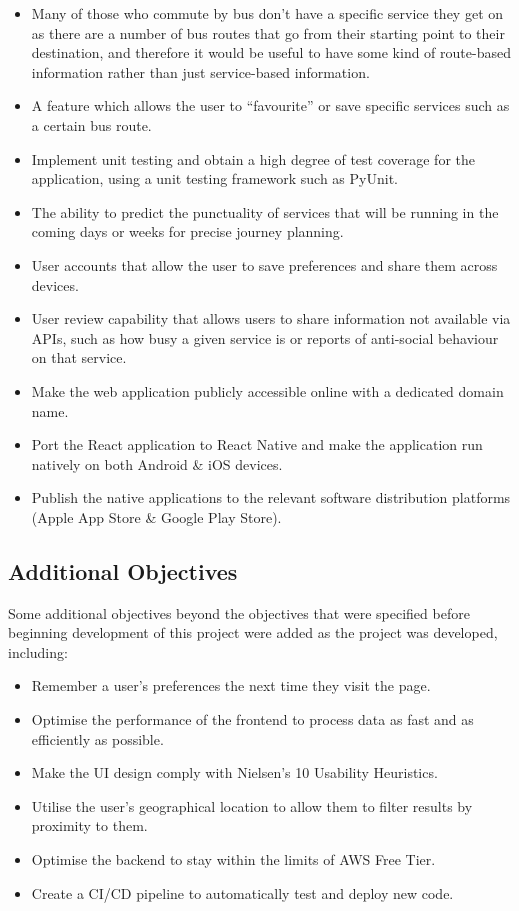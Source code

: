 \documentclass[a4paper,11pt]{report}
\begin{document}
\begin{itemize}
    \item   Many of those who commute by bus don't have a specific service they get on as there are a number of bus routes that go from their starting point to their destination, and therefore it would be useful to have some kind of route-based information rather than just service-based information. 
    \item   A feature which allows the user to ``favourite'' or save specific services such as a certain bus route.
    \item   Implement unit testing and obtain a high degree of test coverage for the application, using a unit testing framework such as PyUnit\supercite{pyunit}.
    \item   The ability to predict the punctuality of services that will be running in the coming days or weeks for precise journey planning.
    \item   User accounts that allow the user to save preferences and share them across devices.
    \item   User review capability that allows users to share information not available via APIs, such as how busy a given service is or reports of anti-social behaviour on that service.
    \item   Make the web application publicly accessible online with a dedicated domain name.
    \item   Port the React\supercite{react} application to React Native\supercite{native} and make the application run natively on both Android \& iOS devices.
    \item   Publish the native applications to the relevant software distribution platforms (Apple App Store \& Google Play Store).
\end{itemize}

\subsection{Additional Objectives}
Some additional objectives beyond the objectives that were specified before beginning development of this project were added as the project was developed, including:
\begin{itemize}
    \item   Remember a user's preferences the next time they visit the page.
    \item   Optimise the performance of the frontend to process data as fast and as efficiently as possible.
    \item   Make the UI design comply with Nielsen's 10 Usability Heuristics\supercite{nielsenheuristics}.
    \item   Utilise the user's geographical location to allow them to filter results by proximity to them.
    \item   Optimise the backend to stay within the limits of AWS Free Tier\supercite{awsfree}.
    \item   Create a CI/CD pipeline to automatically test and deploy new code.
\end{itemize}
\end{document}
